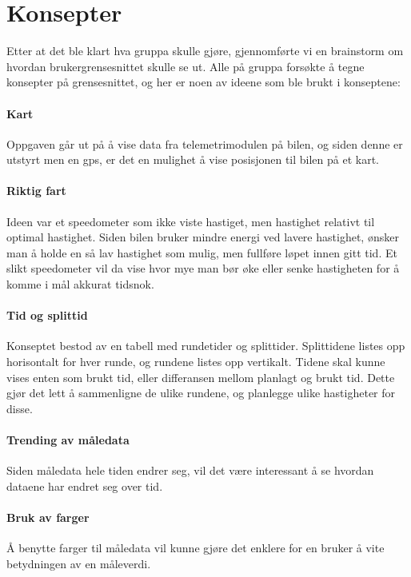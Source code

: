 \section{Konsepter}
Etter at det ble klart hva gruppa skulle gjøre, gjennomførte vi en brainstorm om hvordan brukergrensesnittet skulle se ut.
Alle på gruppa forsøkte å tegne konsepter på grensesnittet, og her er noen av ideene som ble brukt i konseptene:

\paragraph{Kart}
Oppgaven går ut på å vise data fra telemetrimodulen på bilen, og siden denne er utstyrt men en gps, er det en mulighet å vise posisjonen til bilen på et kart.

\paragraph{Riktig fart}
Ideen var et speedometer som ikke viste hastiget, men hastighet relativt til optimal hastighet. 
Siden bilen bruker mindre energi ved lavere hastighet, ønsker man å holde en så lav hastighet som mulig, men fullføre løpet innen gitt tid.
Et slikt speedometer vil da vise hvor mye man bør øke eller senke hastigheten for å komme i mål akkurat tidsnok.

\paragraph{Tid og splittid}
Konseptet bestod av en tabell med rundetider og splittider.
Splittidene listes opp horisontalt for hver runde, og rundene listes opp vertikalt.
Tidene skal kunne vises enten som brukt tid, eller differansen mellom planlagt og brukt tid.
Dette gjør det lett å sammenligne de ulike rundene, og planlegge ulike hastigheter for disse.

\paragraph{Trending av måledata}
Siden måledata hele tiden endrer seg, vil det være interessant å se hvordan dataene har endret seg over tid.

\paragraph{Bruk av farger}
Å benytte farger til måledata vil kunne gjøre det enklere for en bruker å vite betydningen av en måleverdi.

